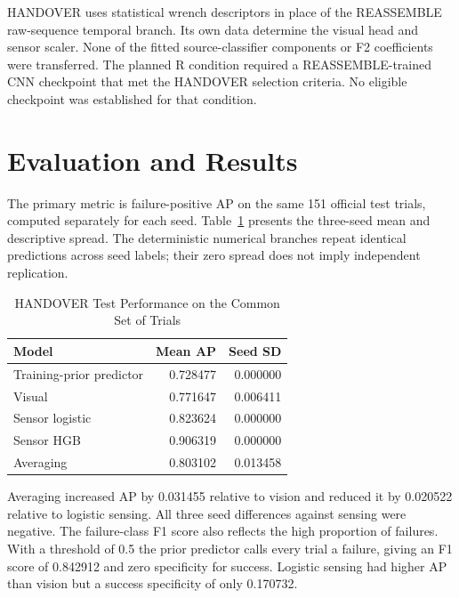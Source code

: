 HANDOVER uses statistical wrench descriptors in place of the REASSEMBLE raw-sequence
temporal branch. Its own data determine the visual head and sensor scaler. None of the
fitted source-classifier components or F2 coefficients were transferred. The planned R
condition required a REASSEMBLE-trained CNN checkpoint that met the HANDOVER selection
criteria. No eligible checkpoint was established for that condition.

\section{Evaluation and Results}
The primary metric is failure-positive AP on the same 151 official test trials, computed
separately for each seed. Table~\ref{tab:handover-clean} presents the three-seed mean
and descriptive spread. The deterministic numerical branches repeat identical
predictions across seed labels; their zero spread does not imply independent
replication.

\begin{table}[htbp]
\caption{HANDOVER Test Performance on the Common Set of Trials}\label{tab:handover-clean}
\centering\small

\begin{tabular}{lrr}\toprule Model&Mean AP&Seed SD\\\midrule
Training-prior predictor&0.728477&0.000000\\
Visual&0.771647&0.006411\\
Sensor logistic&0.823624&0.000000\\
Sensor HGB&0.906319&0.000000\\
Averaging&0.803102&0.013458\\\bottomrule
\end{tabular}
\end{table}

Averaging increased AP by 0.031455 relative to vision and reduced it by 0.020522
relative to logistic sensing. All three seed differences against sensing were negative.
The failure-class F1 score also reflects the high proportion of failures. With a threshold of 0.5
the prior predictor calls every trial a failure, giving an F1 score of 0.842912 and zero
specificity for success. Logistic sensing had higher AP than vision but a success
specificity of only 0.170732.

